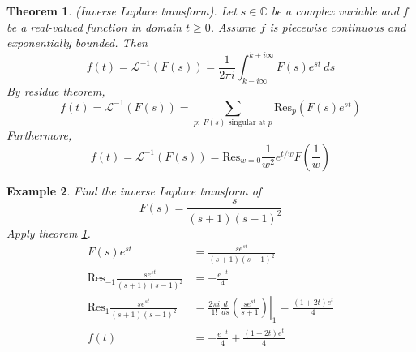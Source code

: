 \documentclass{article}
\newtheorem{theorem}{Theorem}[section]
\newtheorem{example}[theorem]{Example}
\theoremstyle{definition}
\begin{document}
\begin{theorem} \label{thm:inv-laplace}
    (Inverse Laplace transform). Let $s \in \mathbb{C}$ be a complex variable and $f$ be a real-valued function in domain $t \geq 0$. Assume $f$ is piecewise continuous and exponentially bounded. Then
    \begin{equation*}
        f(t) = \mathcal{L}^{-1} (F(s)) = \frac{1}{2 \pi i} \int_{k-i\infty}^{k+i\infty} F(s) e^{st}\ ds
    \end{equation*}
    By residue theorem,
    \begin{equation*}
        f(t) = \mathcal{L}^{-1} (F(s)) = \sum_{p:\ F(s) \text{ singular at } p} \text{Res}_p(F(s)e^{st})
    \end{equation*}
    Furthermore,
    \begin{equation*}
        f(t) = \mathcal{L}^{-1} (F(s)) = \text{Res}_{w=0} \frac{1}{w^2} e^{t/w} F \left( \frac{1}{w} \right)
    \end{equation*}
\end{theorem}

\begin{example} \normalfont
    Find the inverse Laplace transform of
    \begin{equation*}
        F(s) = \frac{s}{(s+1)(s-1)^2}
    \end{equation*}
    Apply theorem \ref{thm:inv-laplace}.
    \begin{align*}
        F(s) e^{st} &= \frac{se^{st}}{(s+1)(s-1)^2} \\
        \text{Res}_{-1} \frac{se^{st}}{(s+1)(s-1)^2} &= -\frac{e^{-t}}{4} \\
        \text{Res}_1 \frac{se^{st}}{(s+1)(s-1)^2} &= \left. \frac{2 \pi i}{1!} \frac{d}{ds} \left( \frac{se^{st}}{s+1} \right) \right\rvert_1 = \frac{(1+2t)e^t}{4} \\
        f(t) &= -\frac{e^{-t}}{4} + \frac{(1+2t)e^t}{4}
    \end{align*}
\end{example}
\end{document}
